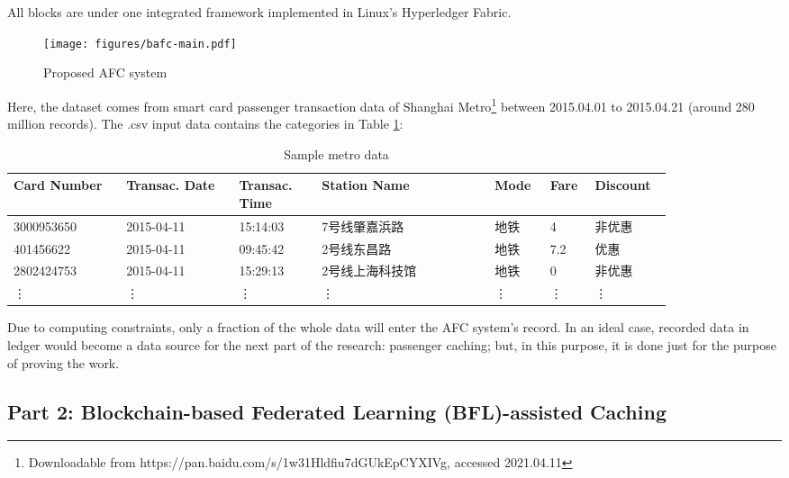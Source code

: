 \documentclass[a4paper,12pt,oneside, utf8x]{report}
\begin{document}
All blocks are under one integrated framework implemented in Linux’s Hyperledger Fabric. 

    \begin{figure}[H]
        \centering
        \texttt{[image: figures/bafc-main.pdf]}
        \caption{Proposed AFC system}
        \label{f33}
    \end{figure}
    
Here, the dataset comes from smart card passenger transaction data of Shanghai Metro\footnote{Downloadable from https://pan.baidu.com/s/1w31Hldfiu7dGUkEpCYXIVg, accessed 2021.04.11} between 2015.04.01 to 2015.04.21 (around 280 million records). The .csv input data contains the categories in Table \ref{tdata}:

\begin{table}[]
\caption{Sample metro data}
\label{tdata}
\begin{tabular}{p{0.15\linewidth}p{0.15\linewidth}p{0.11\linewidth}p{0.23\linewidth}p{0.07\linewidth}p{0.05\linewidth}p{0.09\linewidth}}
\textbf{Card Number} & \textbf{Transac. Date} & \textbf{Transac. Time} & \textbf{Station Name} & \textbf{Mode} & \textbf{Fare\footnotemark} & \textbf{Discount}\\ \hline
3000953650 & 2015-04-11 & 15:14:03 & 7号线肇嘉浜路 & 地铁 & 4 & 非优惠 \\ \hline
401456622 & 2015-04-11 & 09:45:42 & 2号线东昌路 & 地铁 & 7.2 & 优惠 \\ \hline
2802424753 & 2015-04-11 & 15:29:13 & 2号线上海科技馆 & 地铁 & 0 & 非优惠 \\ \hline
\vdots & \vdots & \vdots & \vdots & \vdots & \vdots & \vdots \\ 

\end{tabular}
\end{table}

Due to computing constraints, only a fraction of the whole data will enter the AFC system’s record. In an ideal case, recorded data in ledger would become a data source for the next part of the research: passenger caching; but, in this purpose, it is done just for the purpose of proving the work.

\subsection{Part 2: Blockchain-based Federated Learning (BFL)-assisted Caching}
\end{document}
